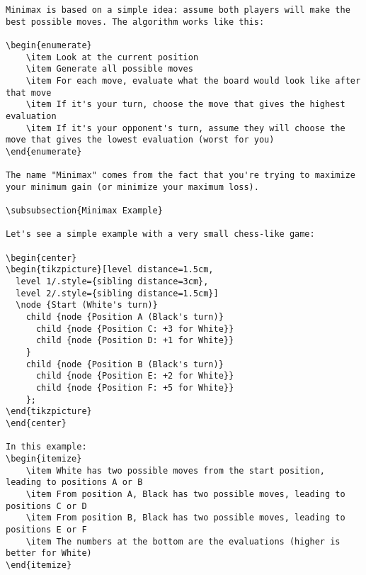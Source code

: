 \documentclass[11pt]{article}
\begin{document}
\begin{lstlisting}[style=Python]
Minimax is based on a simple idea: assume both players will make the best possible moves. The algorithm works like this:

\begin{enumerate}
    \item Look at the current position
    \item Generate all possible moves
    \item For each move, evaluate what the board would look like after that move
    \item If it's your turn, choose the move that gives the highest evaluation
    \item If it's your opponent's turn, assume they will choose the move that gives the lowest evaluation (worst for you)
\end{enumerate}

The name "Minimax" comes from the fact that you're trying to maximize your minimum gain (or minimize your maximum loss).

\subsubsection{Minimax Example}

Let's see a simple example with a very small chess-like game:

\begin{center}
\begin{tikzpicture}[level distance=1.5cm,
  level 1/.style={sibling distance=3cm},
  level 2/.style={sibling distance=1.5cm}]
  \node {Start (White's turn)}
    child {node {Position A (Black's turn)}
      child {node {Position C: +3 for White}}
      child {node {Position D: +1 for White}}
    }
    child {node {Position B (Black's turn)}
      child {node {Position E: +2 for White}}
      child {node {Position F: +5 for White}}
    };
\end{tikzpicture}
\end{center}

In this example:
\begin{itemize}
    \item White has two possible moves from the start position, leading to positions A or B
    \item From position A, Black has two possible moves, leading to positions C or D
    \item From position B, Black has two possible moves, leading to positions E or F
    \item The numbers at the bottom are the evaluations (higher is better for White)
\end{itemize}


\end{lstlisting}
\end{document}
